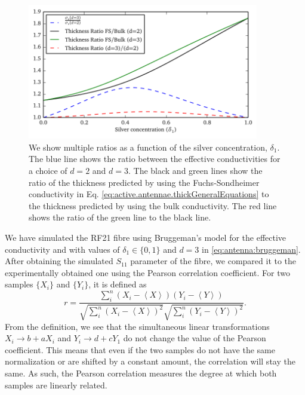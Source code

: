 \begin{figure}
  \centering
  \includegraphics[width=0.9\textwidth]{figs/active/comparisonThickness.pdf}
  \caption[Thickness ratios as a function of the silver concentration]
	  {We show multiple ratios as a function of the silver concentration,
	  $\delta_1$. The blue line shows the ratio between the effective
	  conductivities for a choice of $d=2$ and $d=3$. The black and 
	  green lines show the ratio of the thickness predicted by using
	  the Fuchs-Sondheimer conductivity in Eq. \eqref{eq:active.antennae.thickGeneralEquations}
	  to the thickness predicted by using the bulk conductivity.
	  The red line shows the ratio of the green line to the black line.}
  \label{fig:antenna.thicknessRatios}
\end{figure}

We have simulated the RF21 fibre using Bruggeman's model
for the effective conductivity and with values
of $\delta_1\in\{0,1\}$ and $d=3$ in \eqref{eq:antenna:bruggeman}.
After obtaining the simulated $S_\text{11}$ parameter of the fibre,
we compared it to the experimentally obtained one using the Pearson
correlation coefficient. For two samples $\{X_i\}$ and 
$\{Y_i\}$, it is defined as
  \begin{equation}
    r = \frac{\sum_i^n\left(X_i-\left\langle X\right\rangle\right)\left(Y_i-\left\langle Y\right\rangle\right)}
	     {\sqrt{\sum_i^n\left(X_i-\left\langle X\right\rangle\right)^2}\sqrt{\sum_i^n\left(Y_i-\left\langle Y\right\rangle\right)^2}}.
  \end{equation}
From the definition, we see that the simultaneous linear transformations $X_i\rightarrow b+aX_i$ and $Y_i\rightarrow d+cY_1$
do not change the value of the Pearson coefficient. This means that even if the two samples
do not have the same normalization or are shifted by a constant amount, the correlation 
will stay the same. As such, the Pearson correlation measures the degree at which 
both samples are linearly related. 

